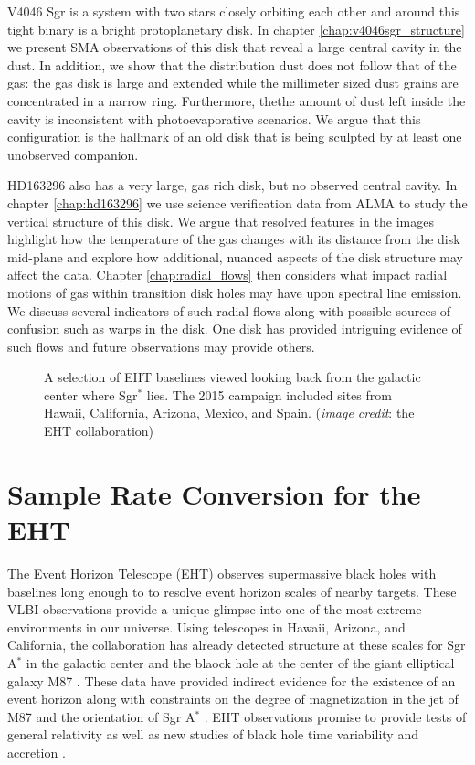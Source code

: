 V4046 Sgr is a system with two stars closely orbiting each other and around this tight binary is a bright
protoplanetary disk.  In chapter \ref{chap:v4046sgr_structure} we present SMA observations 
of this disk that reveal a large central cavity in the dust.  In addition, we show that the distribution dust 
does not follow that of the gas: the gas disk is large and extended while the 
millimeter sized dust grains are concentrated in a narrow ring.  Furthermore, thethe amount of dust left inside
the cavity is inconsistent with photoevaporative scenarios.  We argue 
that this configuration is the hallmark of an old disk that is being sculpted by at least one unobserved 
companion. 

HD163296 also has a very large, gas rich disk, but no observed central cavity.  In chapter \ref{chap:hd163296} 
we use science verification data from ALMA to study the vertical structure of 
this disk.  We argue that resolved features in the images highlight how the temperature of the gas changes with
its distance from the disk mid-plane and explore how additional, nuanced aspects of the disk structure may affect
the data.  Chapter \ref{chap:radial_flows} then considers what impact radial motions of gas within transition 
disk holes may have upon spectral line emission.  We discuss several indicators of such radial flows along 
with possible sources of confusion such as warps in the disk.  One disk has provided intriguing
evidence of such flows \citep{casassus13,cassasus15} and future observations may provide others.

\begin{figure}[t]
\caption{A selection of EHT baselines viewed looking back from the galactic center where Sgr$^\ast$ lies.  The 
2015 campaign included sites 
from Hawaii, California, Arizona, Mexico, and Spain. ({\it image credit}: the EHT collaboration)}
\end{figure}

\section{Sample Rate Conversion for the EHT}

The Event Horizon Telescope (EHT) observes supermassive black holes with baselines long enough to
to resolve event horizon scales of nearby targets.  These VLBI observations provide a 
unique glimpse into one of the most extreme environments in our universe.  Using telescopes in Hawaii, Arizona, 
and California, the collaboration has already detected structure at these scales for Sgr A$^\ast$ in the galactic 
center and the blaock hole at the center of the giant elliptical galaxy M87 
\citep{doeleman08,doeleman09}.  These data have provided indirect 
evidence for the existence of an event horizon \citep{broderick15} along with constraints on the degree of 
magnetization in the jet of M87 \citep{kino15} and the orientation of Sgr A$^\ast$ \citep{broderick11}.  EHT 
observations promise to provide tests of general relativity \citep{luminet79,johannsen10,bambi13,broderick14} as 
well as new studies of black hole time variability \citep{doeleman09} and accretion \citep{chan15}.

